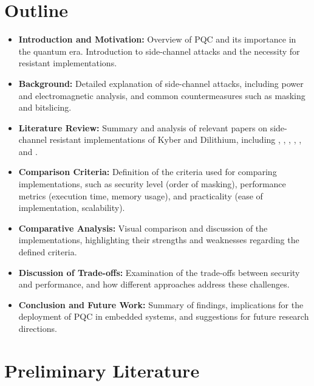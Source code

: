\documentclass{scrartcl}
\begin{document}
\section*{Outline}
\begin{itemize}
	\item \textbf{Introduction and Motivation:} Overview of PQC and its importance in the quantum era. Introduction to side-channel attacks and the necessity for resistant implementations.
	\item \textbf{Background:} Detailed explanation of side-channel attacks, including power and electromagnetic analysis, and common countermeasures such as masking and bitslicing.
	\item \textbf{Literature Review:} Summary and analysis of relevant papers on side-channel resistant implementations of Kyber and Dilithium, including \cite{Migliore19}, \cite{Heinz20}, \cite{Bos21}, \cite{Azouaoui22}, \cite{Coron23}, and \cite{Bronchain22}.
	\item \textbf{Comparison Criteria:} Definition of the criteria used for comparing implementations, such as security level (order of masking), performance metrics (execution time, memory usage), and practicality (ease of implementation, scalability).
	\item \textbf{Comparative Analysis:} Visual comparison and discussion of the implementations, highlighting their strengths and weaknesses regarding the defined criteria.
	\item \textbf{Discussion of Trade-offs:} Examination of the trade-offs between security and performance, and how different approaches address these challenges.
	\item \textbf{Conclusion and Future Work:} Summary of findings, implications for the deployment of PQC in embedded systems, and suggestions for future research directions.
\end{itemize}

\section*{Preliminary Literature}


\end{document}

